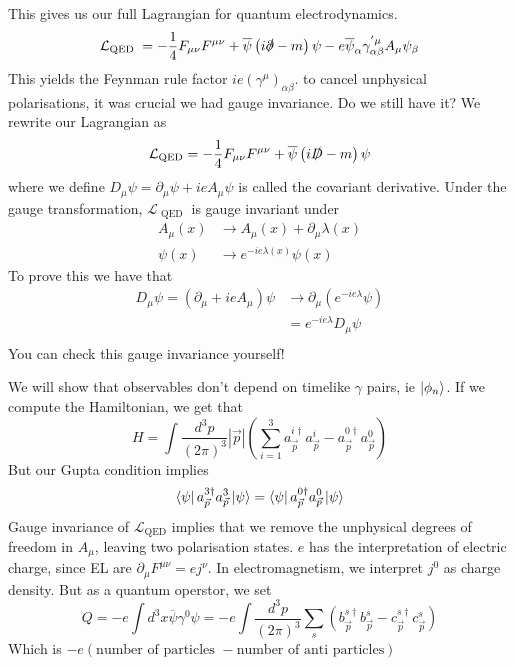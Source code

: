 This gives us our full Lagrangian for quantum electrodynamics. 
\[
 \mathcal{ L } _{ \text{QED } }  = -\frac{1}{4 } F_{ \mu \nu } F ^{ \mu \nu } + 
 \overline{ \psi } \left( i \slashed{\partial} -m  \right)\psi  - e \overline{ \psi } 
 _ \alpha \gamma _{ \alpha \beta } ^{' \mu } A _ \mu \psi _ \beta 
\] This yields the Feynman rule factor $ i e \left( \gamma ^ \mu  \right)  _{ \alpha \beta } $. 
to cancel unphysical polarisations, it 
was crucial we had gauge invariance. Do we still 
have it? We rewrite our Lagrangian as 
\[
 \mathcal{ L } _{ \text{QED} }  = - \frac{1}{4 } F _{ \mu \nu } F ^{ \mu \nu } 
 + \overline{ \psi } \left( i \slashed{D} - m   \right)  \psi 
\] where we define $ D_ \mu \psi  = \partial  _ \mu \psi + i e A _ \mu \psi  $ 
is called the covariant derivative.
Under the gauge transformation, $ \mathcal{ L } _{ \text{ QED } } $ 
is gauge invariant under 
\begin{align*}
	A _ \mu ( x ) & \to A _ \mu ( x ) + \partial  _ \mu \lambda ( x ) \\
	\psi ( x) & \to e ^{  - i e \lambda ( x) } \psi ( x) 
\end{align*}
To prove this we have that 
\begin{align*}
	D_ \mu \psi  = ( \partial  _ \mu + i e A _ \mu ) \psi & \to \partial  _ \mu ( 
	e^{ - i  e \lambda } \psi ) \\
	&=  e ^{ - i e \lambda }  D_ \mu \psi  \\
\end{align*}
You can check this gauge invariance yourself!

We will show that observables don't depend on timelike 
$ \gamma $ pairs, ie $ \ket{ \phi _ n } $. 
If we compute the Hamiltonian, we 
get that 
\[
	H = \int \frac{d ^ 3p  }{( 2 \pi )^{ 3 }  } | \vec{p} | \left( 
	\sum _{ i =  1 } ^ 3 a_{ \vec{p} } ^{ i \dagger } a_{\vec{p} } ^ i - a _{ \vec{p} } ^{ 0 \dagger } 
a _{ \vec{p} } ^ 0 \right)  
\] But our Gupta condition implies 
\[
 \bra{ \psi }a_{\vec{p} } ^{ 3 \dagger } a_{\vec{p} } ^ 3 \ket{ \psi }  = 
 \bra{ \psi }a_{\vec{p} } ^{ 0 \dagger } a _{ \vec{p} } ^ 0 \ket{ \psi } 
\]
Gauge invariance of $\mathcal{ L } _{ \text{QED} } $ implies that 
we remove the unphysical degrees of freedom in $ A _ \mu $, 
leaving two polarisation states. $ e $ has the interpretation of 
electric charge, since EL are $ \partial  _ \mu F ^{ \mu \nu}  = e j ^ \nu $. 
In electromagnetism, we interpret $ j ^ 0 $ as charge density. 
But as a quantum operstor, we set 
\[
 Q =  - e \int d ^ 3 x \overline{ \psi } \gamma ^ 0 \psi =  - e 
 \int \frac{ d ^ 3 p }{ \left( 2 \pi  \right)  ^ 3 } \sum_{ s } \left( 
 b _{ \vec{p} } ^{ s \dagger } b _{ \vec{p} } ^ s - c _{\vec{p} } ^{ s\dagger } c _{\vec{p} } ^ s \right) 
\] Which is $ - e \left( \text{number of particles }  - \text{number of anti particles} \right) $ 

